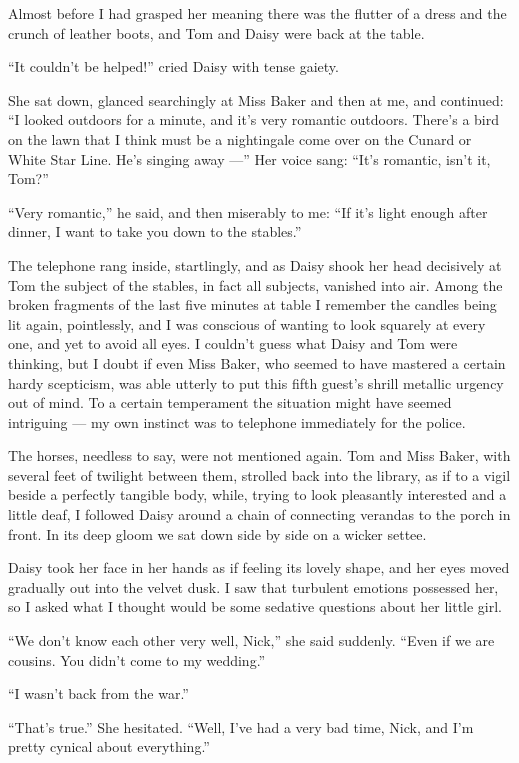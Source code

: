 \documentclass{znotebook}
\begin{document}
Almost before I had grasped her meaning there was the flutter of a dress and the crunch of leather boots, and Tom and Daisy were back at the table.

``It couldn't be helped!'' cried Daisy with tense gaiety.

She sat down, glanced searchingly at Miss Baker and then at me, and continued: ``I looked outdoors for a minute, and it's very romantic outdoors. There's a bird on the lawn that I think must be a nightingale come over on the Cunard or White Star Line. He's singing away ---'' Her voice sang: ``It's romantic, isn't it, Tom?''

``Very romantic,'' he said, and then miserably to me: ``If it's light enough after dinner, I want to take you down to the stables.''

The telephone rang inside, startlingly, and as Daisy shook her head decisively at Tom the subject of the stables, in fact all subjects, vanished into air. Among the broken fragments of the last five minutes at table I remember the candles being lit again, pointlessly, and I was conscious of wanting to look squarely at every one, and yet to avoid all eyes. I couldn't guess what Daisy and Tom were thinking, but I doubt if even Miss Baker, who seemed to have mastered a certain hardy scepticism, was able utterly to put this fifth guest's shrill metallic urgency out of mind. To a certain temperament the situation might have seemed intriguing ---{} my own instinct was to telephone immediately for the police.

The horses, needless to say, were not mentioned again. Tom and Miss Baker, with several feet of twilight between them, strolled back into the library, as if to a vigil beside a perfectly tangible body, while, trying to look pleasantly interested and a little deaf, I followed Daisy around a chain of connecting verandas to the porch in front. In its deep gloom we sat down side by side on a wicker settee.

Daisy took her face in her hands as if feeling its lovely shape, and her eyes moved gradually out into the velvet dusk. I saw that turbulent emotions possessed her, so I asked what I thought would be some sedative questions about her little girl.

``We don't know each other very well, Nick,'' she said suddenly. ``Even if we are cousins. You didn't come to my wedding.''

``I wasn't back from the war.''

``That's true.'' She hesitated. ``Well, I've had a very bad time, Nick, and I'm pretty cynical about everything.''
\end{document}
